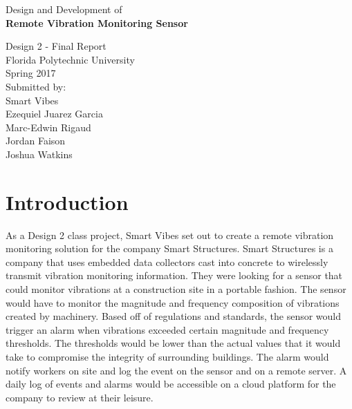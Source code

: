\documentclass[11pt]{article}
\begin{document}
\begin{center}

\large
{}
\vspace*{\fill}
Design and Development of\\
\textbf{Remote Vibration Monitoring Sensor}

\vspace{2cm}

Design 2 - Final Report \\
Florida Polytechnic University \\
Spring 2017\\

\vspace{2cm}
Submitted by:\\
Smart Vibes\\
Ezequiel Juarez Garcia\\
Marc-Edwin Rigaud\\
Jordan Faison\\
Joshua Watkins
\vspace*{\fill}

\end{center}

\newpage

\tableofcontents

\newpage

\section{Introduction}

As a Design 2 class project, Smart Vibes set out to create a remote vibration monitoring solution for the company Smart Structures. Smart Structures is a company that uses embedded data collectors cast into concrete to wirelessly transmit vibration monitoring information. They were looking for a sensor that could monitor vibrations at a construction site in a portable fashion. The sensor would have to monitor the magnitude and frequency composition of vibrations created by machinery. Based off of regulations and standards, the sensor would trigger an alarm when vibrations exceeded certain magnitude and frequency thresholds. The thresholds would be lower than the actual values that it would take to compromise the integrity of surrounding buildings. The alarm would notify workers on site and log the event on the sensor and on a remote server. A daily log of events and alarms would be accessible on a cloud platform for the company to review at their leisure.
\end{document}
